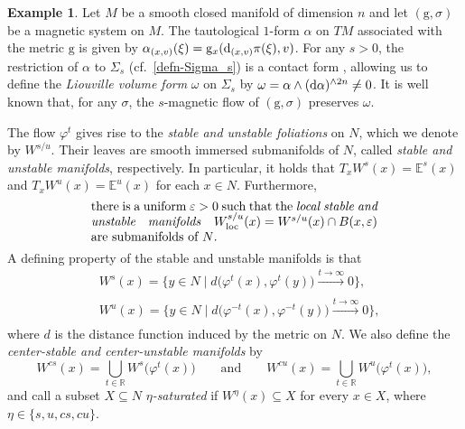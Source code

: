 \documentclass[pdftex]{sigma}
\newcommand{\g}{\mathrm{g}}
\numberwithin{equation}{section}
\theoremstyle{definition}
\newtheorem{Example}[Theorem]{Example}
\begin{document}
\begin{Example} Let $M$ be a smooth closed manifold of dimension $n$ and let $(\g, \sigma)$ be a magnetic system on $M$. The tautological $1$-form $\alpha$ on $TM$ associated with the metric $\g$ is given by \mbox{$\alpha_{(x,v)}(\xi) = \g_x({\rm d}_{(x,v)}\pi(\xi), v)$}. For any $s>0$, the restriction of $\alpha$ to $\Sigma_s$ (cf.\ \eqref{defn-Sigma_s}) is a contact form \cite{paternain1999geodesic}, allowing us to define the \emph{Liouville volume form} $\omega$ on $\Sigma_s$ by $\omega = \alpha \wedge ({\rm d}\alpha)^{\wedge 2n}\neq 0$. It is well known that, for any $\sigma$, the $s$-magnetic flow of $(\g,\sigma)$ preserves $\omega$.
\end{Example}

The flow $\varphi^t$ gives rise to the \emph{stable and unstable foliations} on $N$, which we denote by $W^{s/u}$. Their leaves are smooth immersed submanifolds of $N$, called \emph{stable and unstable manifolds}, respectively. In particular, it holds that $T_xW^s(x) = \mathbb{E}^s(x)$ and $T_xW^u(x) = \mathbb{E}^u(x)$ for each $x\in N$. Furthermore,
\begin{equation}\label{local-s/u}
 \parbox{.66\textwidth}{there is a uniform $\varepsilon > 0$ such that the \emph{local stable and unstable manifolds} ${W^{s/u}_{\rm loc}(x) = W^{s/u}(x) \cap B(x, \varepsilon)}$ are submanifolds of $N$.}
\end{equation}
A defining property of the stable and unstable manifolds is that
\begin{equation}\label{Ws-bounded-distance} \begin{split}
&W^s(x) = \bigl\{y \in N \mid d\bigl(\varphi^t(x), \varphi^t(y)\bigr) \xrightarrow[]{t \rightarrow \infty} 0\bigr\},
 \\
& W^u(x) = \bigl\{ y \in N \mid d\bigl(\varphi^{-t}(x), \varphi^{-t}(y)\bigr) \xrightarrow[]{t \rightarrow \infty} 0\bigr\}, \end{split}\end{equation}where $d$ is
 the distance function induced by the metric on $N$. We also define the \emph{center-stable and center-unstable manifolds} by
\begin{equation}\label{center-stable} W^{cs}(x) = \bigcup_{t \in \mathbb{R}} W^s\bigl(\varphi^t(x)\bigr) \qquad\text{and}\qquad W^{cu}(x) = \bigcup_{t \in \mathbb{R}} W^u\bigl(\varphi^t(x)\bigr),\end{equation}and call a subset $X \subseteq N$ \emph{$\eta$-saturated} if $W^\eta(x) \subseteq X$ for every $x \in X$, where \mbox{$\eta \in \{s, u, cs, cu\}$.}
\end{document}
